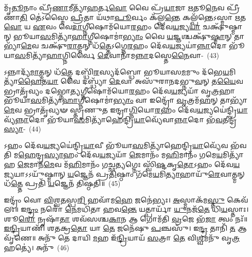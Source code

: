 𑌮𑍃᳴\-\ul{𑌤𑍂}\-𑌨𑌾𑌂 𑌪𑍍𑌰𑍀᳴\-\ul{𑌣𑌾}\-𑌮𑍀𑌤𑍍𑌯𑌾᳴\-\ul{𑌹}\-𑌰𑍍𑌤\-\ul{𑌵𑍋} 𑌵𑍈 𑌪𑍍𑌰᳴\-\ul{𑌯𑌾}\-𑌜𑌾 \ul{𑌋}\-𑌤𑍂\-\ul{𑌨𑍇}\-𑌵 𑌪𑍍𑌰𑍀᳴𑌣𑌾\-\ul{𑌤𑌿} 𑌤𑍇॑\-𑌽𑌸𑍍𑌮𑍈 \ul{𑌪𑍍𑌰𑍀}\-𑌤𑌾 𑌯᳴𑌥𑌾\-\ul{𑌪𑍂}\-𑌰𑍍𑌵𑌂 𑌕᳴𑌲𑍍𑌪\-\ul{𑌨𑍍𑌤𑍇} 𑌕𑌲𑍍𑌪᳴𑌨𑍍𑌤𑍇\-𑌽𑌸𑍍𑌮𑌾 \ul{𑌋}\-𑌤\-\ul{𑌵𑍋} 𑌯 \ul{𑌏}\-𑌵𑌂 𑌵𑍇\-\ul{𑌦𑌾}\-𑌗𑍍𑌨𑍀𑌷𑍋𑌮᳴𑌯𑍋\-\ul{𑌰}\-𑌹𑌂 𑌦𑍇᳴𑌵\-\ul{𑌯}\-𑌜𑍍𑌯\-\ul{𑌯𑌾} 𑌚𑌕𑍍𑌷𑍁᳴𑌷𑍍𑌮𑌾𑌨𑍍 𑌭𑍂𑌯𑌾\-\ul{𑌸}\-𑌮𑌿𑌤𑍍𑌯𑌾᳴\-\ul{𑌹𑌾}\-𑌗𑍍𑌨𑍀𑌷𑍋𑌮𑌾॑\-\ul{𑌭𑍍𑌯𑌾𑌂} 𑌵𑍈 \ul{𑌯}\-𑌜𑍍𑌞𑌶𑍍𑌚𑌕𑍍𑌷𑍁᳴\-\ul{𑌷𑍍𑌮𑌾}\-𑌨𑍍 𑌤𑌾𑌭𑍍𑌯𑌾᳴\-\ul{𑌮𑍇}\-𑌵 𑌚𑌕𑍍𑌷𑍁᳴\-\ul{𑌰𑌾}\-𑌤𑍍𑌮𑌨𑍍 𑌧᳴\-\ul{𑌤𑍍𑌤𑍇}\-\-𑌽𑌗𑍍𑌨𑍇\-\ul{𑌰}\-𑌹𑌂 𑌦𑍇᳴𑌵\-\ul{𑌯}\-𑌜𑍍𑌯𑌯𑌾॑\-\ul{𑌨𑍍𑌨𑌾}\-𑌦𑍋 𑌭𑍂᳴𑌯𑌾\-\ul{𑌸}\-𑌮𑌿𑌤𑍍𑌯𑌾᳴\-\ul{𑌹𑌾}\-𑌗𑍍𑌨𑌿𑌰𑍍𑌵𑍈 \ul{𑌦𑍇}\-𑌵𑌾𑌨𑌾᳴𑌮\-\ul{𑌨𑍍𑌨𑌾}\-𑌦𑌸𑍍𑌤𑍇\-\ul{𑌨𑍈}\-𑌵𑌾-~(43)

𑌽𑌨𑍍𑌨𑌾𑌦𑍍𑌯᳴\-\ul{𑌮𑌾}\-𑌤𑍍𑌮𑌨𑍍 𑌧᳴\-\ul{𑌤𑍍𑌤𑍇} 𑌦𑌬𑍍𑌧𑌿᳴\-\ul{𑌰}\-𑌸𑍍𑌯𑌦᳴𑌬𑍍𑌧𑍋 𑌭𑍂𑌯𑌾𑌸\-\ul{𑌮}\-𑌮𑍁𑌂 𑌦᳴𑌭𑍇\-\ul{𑌯}\-𑌮𑌿𑌤𑍍𑌯𑌾᳴\-\ul{𑌹𑍈}\-𑌤\-\ul{𑌯𑌾} 𑌵𑍈 𑌦𑌬𑍍𑌧𑍍𑌯𑌾᳴ \ul{𑌦𑍇}\-𑌵𑌾 𑌅𑌸𑍁᳴𑌰𑌾𑌨𑌦𑌭𑍍𑌨𑍁\-\ul{𑌵}\-𑌨𑍍 𑌤\-\ul{𑌯𑍈}\-𑌵 𑌭𑍍𑌰𑌾𑌤𑍃᳴𑌵𑍍𑌯𑌂 𑌦𑌭𑍍𑌨𑍋\-\ul{𑌤𑍍𑌯}\-𑌗𑍍𑌨𑍀𑌷𑍋𑌮᳴𑌯𑍋\-\ul{𑌰}\-𑌹𑌂 𑌦𑍇᳴𑌵\-\ul{𑌯}\-𑌜𑍍𑌯𑌯𑌾᳴ 𑌵𑍃\-\ul{𑌤𑍍𑌰}\-𑌹𑌾 𑌭𑍂᳴𑌯𑌾\-\ul{𑌸}\-𑌮𑌿𑌤𑍍𑌯𑌾᳴\-\ul{𑌹𑌾}\-𑌗𑍍𑌨𑍀𑌷𑍋𑌮𑌾॑\-\ul{𑌭𑍍𑌯𑌾𑌂} 𑌵𑌾 𑌇𑌨𑍍𑌦𑍍𑌰𑍋᳴ \ul{𑌵𑍃}\-𑌤𑍍𑌰𑌮᳴\-\ul{𑌹}\-𑌨𑍍 𑌤𑌾𑌭𑍍𑌯𑌾᳴\-\ul{𑌮𑍇}\-𑌵 𑌭𑍍𑌰𑌾𑌤𑍃᳴𑌵𑍍𑌯𑍟 𑌸𑍍𑌤𑍃𑌣𑍁𑌤 𑌇𑌨𑍍𑌦𑍍𑌰𑌾\-\ul{𑌗𑍍𑌨𑌿}\-𑌯𑍋\-\ul{𑌰}\-𑌹𑌂 𑌦𑍇᳴𑌵\-\ul{𑌯}\-𑌜𑍍𑌯𑌯𑍇॑𑌨𑍍𑌦𑍍𑌰𑌿\-\ul{𑌯𑌾}\-𑌵𑍍𑌯᳴\-\ul{𑌨𑍍𑌨𑌾}\-𑌦𑍋 𑌭𑍂᳴𑌯𑌾\-\ul{𑌸}\-𑌮𑌿𑌤𑍍𑌯𑌾᳴𑌹𑍇𑌨𑍍𑌦𑍍𑌰𑌿\-\ul{𑌯𑌾}\-𑌵𑍍𑌯𑍇᳴𑌵𑌾\-\ul{𑌨𑍍𑌨𑌾}\-𑌦𑍋 𑌭᳴\-\ul{𑌵}\-𑌤𑍀𑌨𑍍𑌦𑍍𑌰᳴\-\ul{𑌸𑍍𑌯𑌾}\--~(44)

𑌽𑌹𑌂 𑌦𑍇᳴𑌵\-\ul{𑌯}\-𑌜𑍍𑌯𑌯𑍇॑𑌨𑍍𑌦𑍍𑌰𑌿\-\ul{𑌯𑌾}\-𑌵𑍀 𑌭𑍂᳴𑌯𑌾\-\ul{𑌸}\-𑌮𑌿𑌤𑍍𑌯𑌾᳴𑌹𑍇𑌨𑍍𑌦𑍍𑌰𑌿\-\ul{𑌯𑌾}\-𑌵𑍍𑌯𑍇᳴𑌵 𑌭᳴𑌵𑌤𑌿 𑌮\-\ul{𑌹𑍇}\-𑌨𑍍𑌦𑍍𑌰\-\ul{𑌸𑍍𑌯𑌾}\-𑌹𑌂 𑌦𑍇᳴𑌵\-\ul{𑌯}\-𑌜𑍍𑌯𑌯𑌾᳴ \ul{𑌜𑍇}\-𑌮𑌾𑌨𑌂᳴ 𑌮\-\ul{𑌹𑌿}\-𑌮𑌾𑌨𑌂᳴ 𑌗𑌮𑍇\-\ul{𑌯}\-𑌮𑌿𑌤𑍍𑌯𑌾᳴𑌹 \ul{𑌜𑍇}\-𑌮𑌾𑌨᳴\-\ul{𑌮𑍇}\-𑌵 𑌮᳴\-\ul{𑌹𑌿}\-𑌮𑌾𑌨𑌂᳴ 𑌗𑌚𑍍𑌛\-\ul{𑌤𑍍𑌯}\-𑌗𑍍𑌨𑍇𑌃 𑌸𑍍𑌵𑌿᳴\-\ul{𑌷𑍍𑌟}\-𑌕𑍃\-\ul{𑌤𑍋}\-\-𑌽𑌹𑌂 𑌦𑍇᳴𑌵\-\ul{𑌯}\-𑌜𑍍𑌯𑌯𑌾\-𑌽\-𑌽𑌯𑍁᳴𑌷𑍍𑌮𑌾𑌨𑍍 \ul{𑌯}\-𑌜𑍍𑌞𑍇𑌨᳴ 𑌪𑍍𑌰\-\ul{𑌤𑌿}\-𑌷𑍍𑌠𑌾𑌂 𑌗᳴𑌮𑍇\-\ul{𑌯}\-𑌮𑌿\-\ul{𑌤𑍍𑌯𑌾}\-𑌹𑌾𑌯𑍁᳴\-\ul{𑌰𑍇}\-𑌵𑌾𑌤𑍍𑌮𑌨𑍍 𑌧᳴\-\ul{𑌤𑍍𑌤𑍇} 𑌪𑍍𑌰𑌤𑌿᳴ \ul{𑌯}\-𑌜𑍍𑌞𑍇𑌨᳴ 𑌤𑌿𑌷𑍍𑌠𑌤𑌿॥~(45)

{\anuvakamend[{\-\ul{𑌪𑍍𑌰}\-\-\ul{𑌤𑌿}\-𑌷𑍍𑌠𑌾𑌮᳴\-\ul{𑌹𑍍𑌵}\-𑌦𑌸𑍍𑌤𑍁᳴ \ul{𑌵𑌿}\-𑌦𑍍𑌯𑍁𑌤𑌂᳴ 𑌵\-\ul{𑌸}\-𑌨𑍍𑌤\-\ul{𑌮𑍇}\-𑌵𑍇𑌨𑍍𑌦𑍍𑌰᳴\-\ul{𑌸𑍍𑌯𑌾}\-\-𑌽𑌷𑍍𑌟𑌾𑌤𑍍𑌰𑌿𑍞᳴𑌶𑌚𑍍𑌚}]}%

𑌇𑌨𑍍𑌦𑍍𑌰𑌂᳴ 𑌵𑍋 \ul{𑌵𑌿}\-𑌶𑍍𑌵\-\ul{𑌤}\-𑌸𑍍𑌪\-\ul{𑌰𑌿} 𑌹𑌵𑌾᳴𑌮\-\ul{𑌹𑍇} 𑌜𑌨𑍇॑𑌭𑍍𑌯𑌃। \ul{𑌅}\-𑌸𑍍𑌮𑌾𑌕᳴𑌮\-\ul{𑌸𑍍𑌤𑍁} 𑌕𑍇𑌵᳴𑌲𑌃॥ 𑌇\-\ul{𑌨𑍍𑌦𑍍𑌰𑌂} 𑌨𑌰𑍋᳴ \ul{𑌨𑍇}\-𑌮𑌧𑌿᳴𑌤𑌾 𑌹𑌵\-\ul{𑌨𑍍𑌤𑍇} 𑌯𑌤𑍍𑌪𑌾𑌰𑍍𑌯𑌾᳴ \ul{𑌯𑍁}\-𑌨𑌜᳴\-\ul{𑌤𑍇} 𑌧𑌿\-\ul{𑌯}\-𑌸𑍍𑌤𑌾𑌃। 𑌶𑍂\-\ul{𑌰𑍋} 𑌨𑍃𑌷𑌾᳴\-\ul{𑌤𑌾} 𑌶𑌵᳴𑌸𑌶𑍍𑌚\-\ul{𑌕𑌾}\-𑌨 𑌆 𑌗𑍋𑌮᳴𑌤𑌿 \ul{𑌵𑍍𑌰}\-𑌜𑍇 𑌭᳴\-\ul{𑌜𑌾} 𑌤𑍍𑌵𑌂 𑌨𑌃᳴॥ \ul{𑌇}\-\-\ul{𑌨𑍍𑌦𑍍𑌰𑌿}\-𑌯𑌾𑌣𑌿᳴ 𑌶𑌤𑌕𑍍𑌰\-\ul{𑌤𑍋} 𑌯𑌾 \ul{𑌤𑍇} 𑌜𑌨𑍇᳴𑌷𑍁 \ul{𑌪}\-𑌞𑍍𑌚𑌸𑍁᳴। 𑌇\-\ul{𑌨𑍍𑌦𑍍𑌰} 𑌤𑌾𑌨𑌿᳴ \ul{𑌤} 𑌆 𑌵𑍃᳴𑌣𑍇॥ 𑌅𑌨𑍁᳴ 𑌤𑍇 𑌦𑌾𑌯𑌿 \ul{𑌮}\-𑌹 𑌇᳴\-\ul{𑌨𑍍𑌦𑍍𑌰𑌿}\-𑌯𑌾𑌯᳴ \ul{𑌸}\-𑌤𑍍𑌰𑌾 \ul{𑌤𑍇} 𑌵𑌿\-\ul{𑌶𑍍𑌵}\-𑌮𑌨𑍁᳴ 𑌵𑍃\-\ul{𑌤𑍍𑌰}\-𑌹𑌤𑍍𑌯𑍇॑। 𑌅𑌨𑍁᳴~(46)


